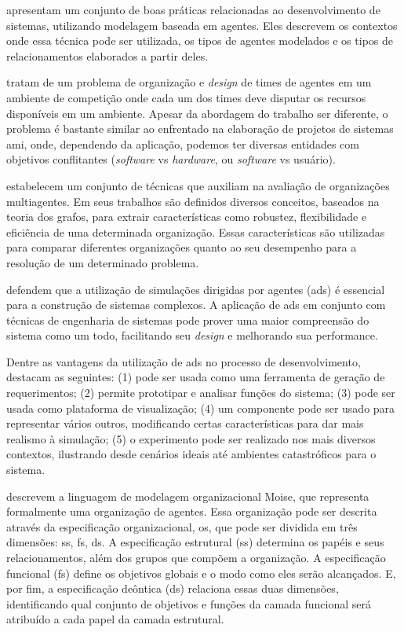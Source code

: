  apresentam um conjunto de boas práticas relacionadas ao desenvolvimento de sistemas, utilizando modelagem baseada em agentes. Eles descrevem os contextos onde essa técnica pode ser utilizada, os tipos de agentes modelados e os tipos de relacionamentos elaborados a partir deles.

 tratam de um problema de organização e \textit{design} de times de agentes em um ambiente de competição onde cada um dos times deve disputar os recursos disponíveis em um ambiente. Apesar da abordagem do trabalho ser diferente, o problema é bastante similar ao enfrentado na elaboração de projetos de sistemas \acrshort{ami}, onde, dependendo da aplicação, podemos ter diversas entidades com objetivos conflitantes (\textit{software} vs \textit{hardware}, ou \textit{software} vs usuário).

 estabelecem um conjunto de técnicas que auxiliam na avaliação de organizações multiagentes. Em seus trabalhos são definidos diversos conceitos, baseados na teoria dos grafos, para extrair características como robustez, flexibilidade e eficiência de uma determinada organização. Essas características são utilizadas para comparar diferentes organizações quanto ao seu desempenho para a resolução de um determinado problema.

 defendem que a utilização de simulações dirigidas por agentes (\acrshort{ads}) é essencial para a construção de sistemas complexos. A aplicação de \acrshort{ads} em conjunto com técnicas de engenharia de sistemas pode prover uma maior compreensão do sistema como um todo, facilitando seu \textit{design} e melhorando sua performance. 

Dentre as vantagens da utilização de \acrshort{ads} no processo de desenvolvimento,  destacam as seguintes: (1) pode ser usada como uma ferramenta de geração de requerimentos; (2) permite prototipar e analisar funções do sistema; (3) pode ser usada como plataforma de visualização; (4) um componente pode ser usado para representar vários outros, modificando certas características para dar mais realismo à simulação; (5) o experimento pode ser realizado nos mais diversos contextos, ilustrando desde cenários ideais até ambientes catastróficos para o sistema. 

 descrevem a linguagem de modelagem organizacional Moise, que representa formalmente uma organização de agentes. Essa organização pode ser descrita através da especificação organizacional, \acrfull{os}, que pode ser dividida em três dimensões: \acrfull{ss}, \acrfull{fs}, \acrfull{ds}. A especificação estrutural (\acrshort{ss}) determina os papéis e seus relacionamentos, além dos grupos que compõem a organização. A especificação funcional (\acrshort{fs}) define os objetivos globais e o modo como eles serão alcançados. E, por fim, a especificação deôntica (\acrshort{ds}) relaciona essas duas dimensões, identificando qual conjunto de objetivos e funções da camada funcional será atribuído a cada papel da camada estrutural. 


